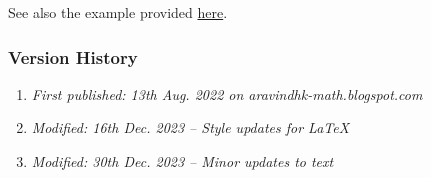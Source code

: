See also the example provided \href{https://gitlab.com/aravindh.krishnamoorthy/mimo-noma}{here}.

\subsubsection{Version History}
\begin{enumerate}
	\item \emph{First published: 13th Aug. 2022 on aravindhk-math.blogspot.com}
	\item \emph{Modified: 16th Dec. 2023 -- Style updates for \LaTeX}
	\item \emph{Modified: 30th Dec. 2023 -- Minor updates to text}
\end{enumerate}
